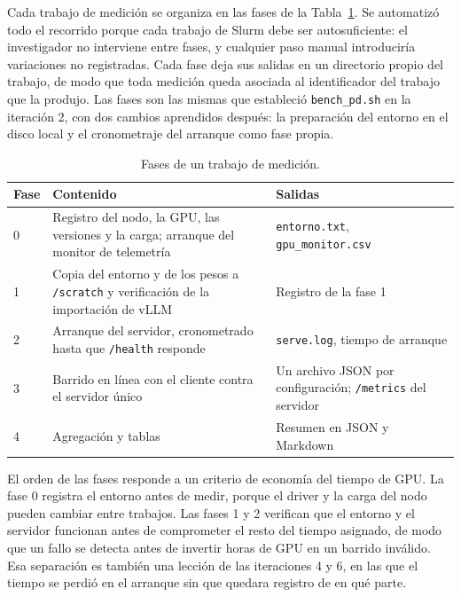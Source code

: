 Cada trabajo de medición se organiza en las fases de la Tabla~\ref{tab:cap2:fases}. Se automatizó todo el recorrido porque cada trabajo de Slurm debe ser autosuficiente: el investigador no interviene entre fases, y cualquier paso manual introduciría variaciones no registradas. Cada fase deja sus salidas en un directorio propio del trabajo, de modo que toda medición queda asociada al identificador del trabajo que la produjo. Las fases son las mismas que estableció \texttt{bench\_pd.sh} en la iteración 2, con dos cambios aprendidos después: la preparación del entorno en el disco local y el cronometraje del arranque como fase propia.

\begin{table}[htbp]
  \centering
  \caption{Fases de un trabajo de medición.}
  \label{tab:cap2:fases}
  \small
  \begin{tabular}{|p{}|p{}|p{}|}
    \hline
    \textbf{Fase} & \textbf{Contenido} & \textbf{Salidas} \\
    \hline
    0 & Registro del nodo, la GPU, las versiones y la carga; arranque del monitor de telemetría & \texttt{entorno.txt}, \texttt{gpu\_monitor.csv} \\
    \hline
    1 & Copia del entorno y de los pesos a \texttt{/scratch} y verificación de la importación de vLLM & Registro de la fase 1 \\
    \hline
    2 & Arranque del servidor, cronometrado hasta que \texttt{/health} responde & \texttt{serve.log}, tiempo de arranque \\
    \hline
    3 & Barrido en línea con el cliente contra el servidor único & Un archivo JSON por configuración; \texttt{/metrics} del servidor \\
    \hline
    4 & Agregación y tablas & Resumen en JSON y Markdown \\
    \hline
  \end{tabular}
\end{table}

El orden de las fases responde a un criterio de economía del tiempo de GPU. La fase 0 registra el entorno antes de medir, porque el driver y la carga del nodo pueden cambiar entre trabajos. Las fases 1 y 2 verifican que el entorno y el servidor funcionan antes de comprometer el resto del tiempo asignado, de modo que un fallo se detecta antes de invertir horas de GPU en un barrido inválido. Esa separación es también una lección de las iteraciones 4 y 6, en las que el tiempo se perdió en el arranque sin que quedara registro de en qué parte.

